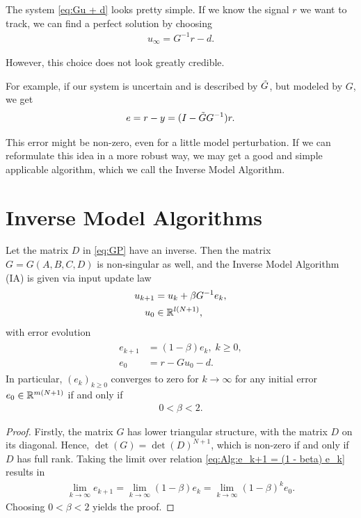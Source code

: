 The system \eqref{eq:Gu + d} looks pretty simple. 
If we know the signal $r$ we want to track, we can find a perfect solution by choosing 
\begin{align}
u_\infty = G^{-1} r -d.
\end{align}

However, this choice does not look greatly  credible. 

For example, if our system is uncertain and is described by $\tilde{G}$, but modeled by $G$, we get 
\begin{align}
e = r - y = (I - \tilde{G} G^{-1} ) r. 
\end{align}

This error might be non-zero, even for a little model perturbation. 
If we can reformulate this idea in a more robust way, we may get a good and simple applicable algorithm, which we call the Inverse Model Algorithm.

\section{Inverse Model Algorithms}

\begin{alg}
	\label{alg:ILC:IA}
	Let the matrix $D$ in \eqref{eq:GP} have an inverse. Then the matrix $G = G(A, B, C, D)$ is non-singular as well, and the Inverse Model Algorithm (IA) is given via input update law 
	\begin{align}
	\label{eq:errRightInv}
	\begin{split}
	u_{k+1} &= u_k + \beta G^{-1} e_k, \\
	u_0 & \in {\mathbb{R}}^{l (N+1)},
	\end{split}	
	\end{align}
	with error evolution
	\begin{align}
	\label{eq:Alg:e_k+1 = (1 - beta) e_k}
	\begin{split}
	e_{k+1} &= (1- \beta) e_{k}, \; k\geq 0, \\
	e_0 &= r -  Gu_0 -d.
	\end{split}
	\end{align}
	In particular, $(e_k)_{k\geq 0}$ converges to zero for $k \to \infty$ for any initial error $e_0 \in {\mathbb{R}}^{m(N+1)}$ if and only if 
	\begin{align*}
	0 < \beta < 2.
	\end{align*}
\end{alg}
\begin{proof}
	Firstly, the matrix $G$ has lower triangular structure, with the matrix $D$ on its diagonal. Hence, $\det(G) = \det(D)^{N+1}$, which is non-zero if and only if $D$ has full rank. 
	Taking the limit over relation \eqref{eq:Alg:e_k+1 = (1 - beta) e_k} results in
	\begin{align}
	\lim_{k \to \infty} e_{k+1} = \lim_{k \to \infty}(1- \beta) e_{k} = \lim_{k \to \infty}(1 - \beta)^k e_0.
	\end{align}
	Choosing $0<\beta < 2$ yields the proof. 
\end{proof}

